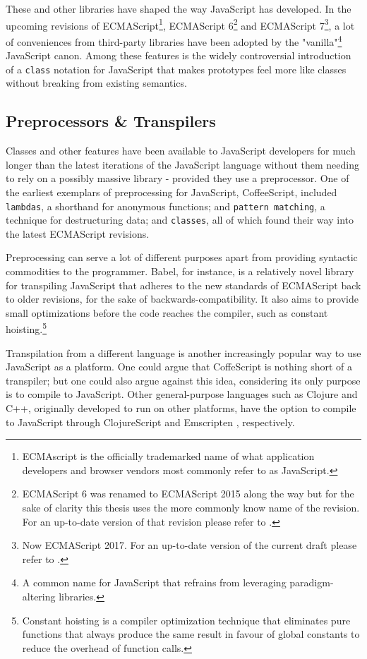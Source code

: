 \documentclass[oneside,11pt,xetex]{scrbook}
\begin{document}
These and other libraries have shaped the way JavaScript has developed. In the
upcoming revisions of ECMAScript\footnote{ECMAscript is the officially trademarked
name of what application developers and browser vendors most commonly refer to as
JavaScript.}, ECMAScript 6\footnote{ECMAScript 6 was renamed to ECMAScript 2015
along the way but for the sake of clarity this thesis uses the more commonly
know name of the revision. For an up-to-date version of that revision please
refer to \parencite{ECMA6}.} and ECMAScript 7\footnote{Now ECMAScript 2017. For
an up-to-date version of the current draft please refer to \parencite{ECMA7}.}, a
lot of conveniences from third-party libraries have been adopted by the
"vanilla"\footnote{A common name for JavaScript that refrains from leveraging
paradigm-altering libraries.} JavaScript canon.
Among these features is the widely controversial introduction of a \texttt{class}
notation for JavaScript that makes prototypes feel more like classes without
breaking from existing semantics.

\subsection{Preprocessors \& Transpilers}
\label{pretrans}

Classes and other features have been available to JavaScript developers for much
longer than the latest iterations of the JavaScript language without them needing
to rely on a possibly massive library - provided they use a preprocessor.
One of the earliest exemplars of preprocessing for JavaScript, CoffeeScript, included
\texttt{lambdas}, a shorthand for anonymous functions; and \texttt{pattern matching},
a technique for destructuring data; and \texttt{classes}, all of which found
their way into the latest ECMAScript revisions.

Preprocessing can serve a lot of different purposes apart from providing
syntactic commodities to the programmer. Babel, for instance, is a relatively
novel library for transpiling JavaScript that adheres to the new standards
of ECMAScript back to older revisions, for the sake of backwards-compatibility.
It also aims to provide small optimizations before the code reaches the compiler,
such as constant hoisting.\footnote{Constant hoisting is a compiler optimization
technique that eliminates pure functions that always produce the same result in favour
of global constants to reduce the overhead of function calls.}

Transpilation from a different language is another increasingly popular
way to use JavaScript as a platform. One could argue that CoffeScript
is nothing short of a transpiler; but one could also argue against this idea,
considering its only purpose is to compile to JavaScript. Other general-purpose
languages such as Clojure and C++, originally developed to run on other platforms,
have the option to compile to JavaScript through ClojureScript \parencite{CLJS} and
Emscripten \parencite{ZAKA}, respectively.
\end{document}

